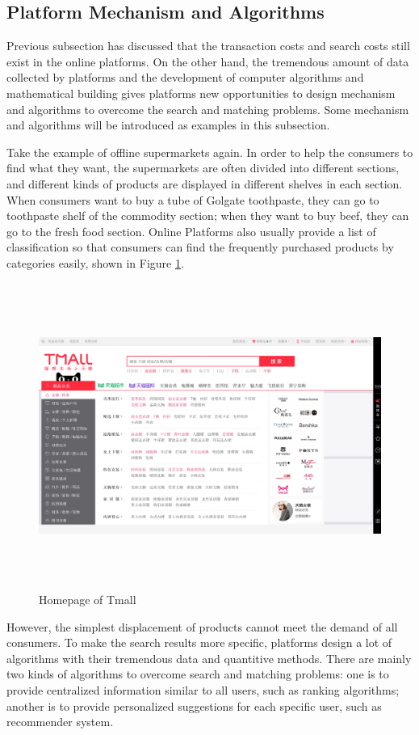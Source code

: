 \documentclass{article}
\begin{document}
\subsection{Platform Mechanism and Algorithms}

Previous subsection has discussed that the transaction costs and search costs still exist in the online platforms. On the other hand, the tremendous amount of data collected by platforms and the development of computer algorithms and mathematical building gives platforms new opportunities to design mechanism and algorithms to overcome the search and matching problems. Some mechanism and algorithms will be introduced as examples in this subsection.
 
Take the example of offline supermarkets again. In order to help the consumers to find what they want, the supermarkets are often divided into different sections, and different kinds of products are displayed in different shelves in each section. When consumers want to buy a tube of Golgate toothpaste, they can go to toothpaste shelf of the commodity section; when they want to buy beef, they can go to the fresh food section. Online Platforms also usually provide a list of classification so that consumers can find the frequently purchased products by categories easily, shown in Figure \ref{category}.

\begin{figure}[H]
\centering
\includegraphics[width=16cm, height=10cm]{graphs/home.jpg}
\caption{\label{category}Homepage of Tmall}
\end{figure} 
 
However, the simplest displacement of products cannot meet the demand of all consumers. To make the search results more specific, platforms design a lot of algorithms with their tremendous data and quantitive methods. There are mainly two kinds of algorithms to overcome search and matching problems: one is to provide centralized information similar to all users, such as ranking algorithms; another is to provide personalized suggestions for each specific user, such as recommender system. 
\end{document}
